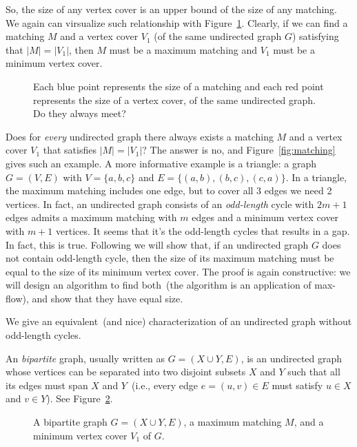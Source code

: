 So, the size of any vertex cover is an upper bound of the size of any matching. We again can virsualize
such relationship with Figure~\ref{fig:meet}. Clearly, if we can find a matching $M$ and a vertex cover $V_1$
(of the same undirected graph $G$) satisfying that $|M| = |V_1|$, then $M$ must be a maximum matching 
and $V_1$ must be a minimum vertex cover.

\begin{figure}[h]
\centering{}
\caption{Each blue point represents the size of a matching and each red point represents the size of a vertex cover,
of the same undirected graph. Do they always meet?}
\label{fig:meet}
\end{figure}

Does for \emph{every} undirected graph there always exists a matching $M$ and a 
vertex cover $V_1$ that satisfies $|M| = |V_1|$?
The answer is no, and Figure~\ref{fig:matching} gives such an example.
A more informative example is a triangle: a graph $G = (V, E)$ with $V = \{a,b,c\}$ and $E = \{(a,b), (b,c), (c,a)\}$.
In a triangle, the maximum matching includes one edge, but to cover all 3 edges we need 2 vertices.
In fact, an undirected graph consists of an \emph{odd-length} cycle with $2m+1$ edges admits
a maximum matching with $m$ edges and a minimum vertex cover with $m+1$ vertices.
It seems that it's the odd-length cycles that results in a gap.
In fact, this is true. Following we will show that, if an undirected
graph $G$ does not contain odd-length cycle, then the size of its maximum matching
must be equal to the size of its minimum vertex cover. The proof is again constructive:
we will design an algorithm to find both~(the algorithm is an application of max-flow), and show that they have equal size.

We give an equivalent~(and nice) characterization of an undirected graph without odd-length cycles.

An \emph{bipartite} graph, usually written as $G = (X\cup Y, E)$, is an undirected graph
whose vertices can be separated into two disjoint subsets $X$ and $Y$ such that all its edges
must span $X$ and $Y$~(i.e., every edge $e = (u,v)\in E$ must satisfy $u\in X$ and $v\in Y$).
See Figure~\ref{fig:bipartite}.

\begin{figure}[h]
\centering{}
\caption{A bipartite graph $G = (X\cup Y, E)$, 
a maximum matching $M$, and a minimum vertex cover $V_1$ of $G$.  }
\label{fig:bipartite}
\end{figure}


